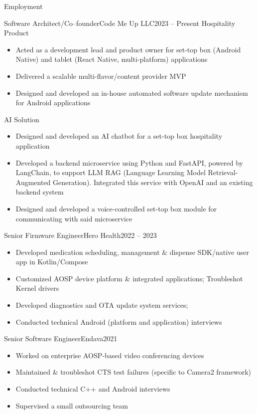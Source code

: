 \documentclass[]{mcdowellcv}
\begin{document}
\begin{cvsection}{Employment}
\begin{cvsubsection}{Software Architect/Co--founder}{Code Me Up LLC}{2023 -- Present}
			Hospitality Product
			\begin{itemize}
				\item Acted as a development lead and product owner for set-top box (Android Native) and tablet (React Native, multi-platform) applications
				\item Delivered a scalable multi-flavor/content provider MVP
				\item Designed and developed an in-house automated software update mechanism for Android applications \newline
			\end{itemize}

			AI Solution
			\begin{itemize}
				\item Designed and developed an AI chatbot for a set-top box hospitality application
				\item Developed a backend microservice using Python and FastAPI, powered by LangChain, to support LLM RAG (Language Learning Model Retrieval-Augmented Generation). Integrated this service with OpenAI and an existing backend system
				\item Designed and developed a voice-controlled set-top box module for communicating with said microservice
			\end{itemize}
			
		\end{cvsubsection}

		\begin{cvsubsection}{Senior Firmware Engineer}{Hero Health}{2022 -- 2023}
			\begin{itemize}
				\item Developed medication scheduling, management \& dispense SDK/native user app in Kotlin/Compose
				\item Customized AOSP device platform \& integrated applications; Troubleshot Kernel drivers
				\item Developed diagnostics and OTA update system services;
				\item Conducted technical Android (platform and application) interviews
			\end{itemize}
		\end{cvsubsection}

		\begin{cvsubsection}{Senior Software Engineer}{Endava}{2021}
			\begin{itemize}
				\item Worked on enterprise AOSP-based video conferencing devices
				\item Maintained \& troubleshot CTS test failures (specific to Camera2 framework)
				\item Conducted technical C++ and Android interviews
				\item Supervised a small outsourcing team
			\end{itemize}
		\end{cvsubsection}


\end{cvsection}
\end{document}
